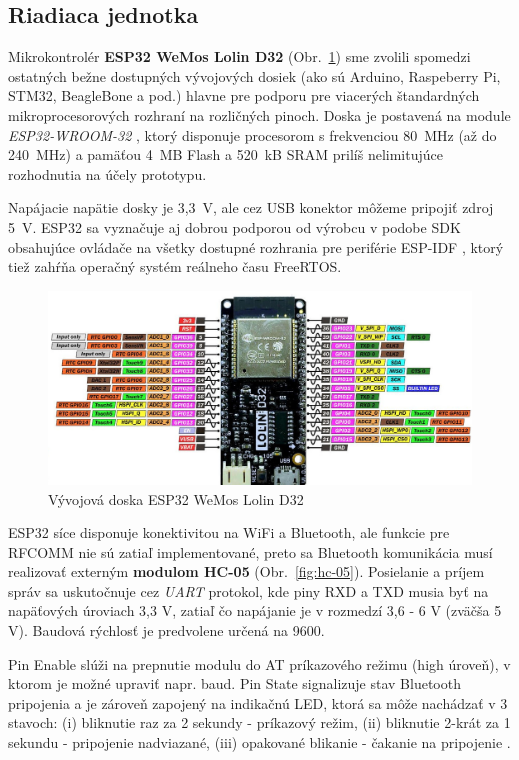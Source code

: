 \documentclass[12pt, a4paper]{article}
\begin{document}
\subsection{Riadiaca jednotka}
Mikrokontrolér \textbf{ESP32 WeMos Lolin D32} (Obr.~\ref{fig:esp32}) sme zvolili spomedzi ostatných bežne dostupných vývojových dosiek (ako sú Arduino, Raspeberry Pi, STM32, BeagleBone a pod.) hlavne pre podporu pre viacerých štandardných mikroprocesorových rozhraní na rozličných pinoch. Doska je postavená na module \emph{ESP32-WROOM-32} \cite{noauthor_esp32-wroom-32_2023}, ktorý disponuje procesorom s frekvenciou 80~MHz (až do 240~MHz) a pamäťou 4~MB Flash a 520~kB SRAM prilíš nelimitujúce rozhodnutia na účely prototypu. 

Napájacie napätie dosky je 3,3~V, ale cez USB konektor môžeme pripojiť zdroj 5~V. ESP32 sa vyznačuje aj dobrou podporou od výrobcu v podobe SDK obsahujúce ovládače na všetky dostupné rozhrania pre periférie ESP-IDF \cite{noauthor_esp-idf_nodate}, ktorý tiež zahŕňa operačný systém reálneho času FreeRTOS.

\begin{figure}[h]
	\centering
	\includegraphics[width=\textwidth]{assets/esp32.jpg}
	\caption{Vývojová doska ESP32 WeMos Lolin D32 \cite{mischianti_esp32_2023}}
	\label{fig:esp32}
\end{figure}

ESP32 síce disponuje konektivitou na WiFi a Bluetooth, ale funkcie pre RFCOMM nie sú zatiaľ implementované, preto sa Bluetooth komunikácia musí realizovať externým \textbf{modulom HC-05} (Obr.~\ref{fig:hc-05}). Posielanie a príjem správ sa uskutočnuje cez \emph{UART} protokol, kde piny RXD a TXD musia byť na napäťových úroviach 3,3 V, zatiaľ čo napájanie je v rozmedzí 3,6 - 6 V (zväčša 5 V). Baudová rýchlosť je predvolene určená na 9600. 

Pin Enable slúži na prepnutie modulu do AT príkazového režimu (high úroveň), v ktorom je možné upraviť napr. baud. Pin State signalizuje stav Bluetooth pripojenia a je zároveň zapojený na indikačnú LED, ktorá sa môže nachádzať v 3 stavoch: (i) bliknutie raz za 2 sekundy - príkazový režim, (ii) bliknutie 2-krát za 1 sekundu - pripojenie nadviazané, (iii) opakované blikanie - čakanie na pripojenie \cite{noauthor_hc-05_nodate}.
\end{document}
